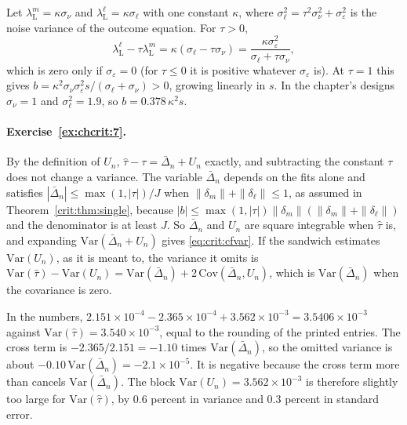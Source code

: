 Let $\lambda_{\mathrm L}^m = \kappa\sigma_\nu$ and $\lambda_{\mathrm L}^\ell = \kappa\sigma_\ell$ with one constant $\kappa$, where $\sigma_\ell^2 = \tau^2\sigma_\nu^2 + \sigma_\varepsilon^2$ is the noise variance of the outcome equation. For $\tau > 0$,
\[
\lambda_{\mathrm L}^\ell - \tau\lambda_{\mathrm L}^m = \kappa(\sigma_\ell - \tau\sigma_\nu) = \frac{\kappa\sigma_\varepsilon^2}{\sigma_\ell + \tau\sigma_\nu},
\]
which is zero only if $\sigma_\varepsilon = 0$ (for $\tau \le 0$ it is positive whatever $\sigma_\varepsilon$ is). At $\tau = 1$ this gives $b = \kappa^2\sigma_\nu\sigma_\varepsilon^2 s/(\sigma_\ell + \sigma_\nu) > 0$, growing linearly in $s$. In the chapter's designs $\sigma_\nu = 1$ and $\sigma_\ell^2 = 1.9$, so $b = 0.378\,\kappa^2 s$.

\paragraph{Exercise~\ref{ex:chcrit:7}.} By the definition of $U_n$, $\hat\tau - \tau = \bar\Delta_n + U_n$ exactly, and subtracting the constant $\tau$ does not change a variance. The variable $\bar\Delta_n$ depends on the fits alone and satisfies $|\bar\Delta_n| \le \max(1, |\tau|)/J$ when $\|\delta_m\| + \|\delta_\ell\| \le 1$, as assumed in Theorem~\ref{crit:thm:single}, because $|b| \le \max(1, |\tau|)\|\delta_m\|(\|\delta_m\| + \|\delta_\ell\|)$ and the denominator is at least $J$. So $\bar\Delta_n$ and $U_n$ are square integrable when $\hat\tau$ is, and expanding $\mathrm{Var}(\bar\Delta_n + U_n)$ gives \eqref{eq:crit:cfvar}. If the sandwich estimates $\mathrm{Var}(U_n)$, as it is meant to, the variance it omits is $\mathrm{Var}(\hat\tau) - \mathrm{Var}(U_n) = \mathrm{Var}(\bar\Delta_n) + 2\,\mathrm{Cov}(\bar\Delta_n, U_n)$, which is $\mathrm{Var}(\bar\Delta_n)$ when the covariance is zero.

In the numbers, $2.151\times 10^{-4} - 2.365\times 10^{-4} + 3.562\times 10^{-3} = 3.5406\times 10^{-3}$ against $\mathrm{Var}(\hat\tau) = 3.540\times 10^{-3}$, equal to the rounding of the printed entries. The cross term is $-2.365/2.151 = -1.10$ times $\mathrm{Var}(\bar\Delta_n)$, so the omitted variance is about $-0.10\,\mathrm{Var}(\bar\Delta_n) = -2.1\times 10^{-5}$. It is negative because the cross term more than cancels $\mathrm{Var}(\bar\Delta_n)$. The block $\mathrm{Var}(U_n) = 3.562\times 10^{-3}$ is therefore slightly too large for $\mathrm{Var}(\hat\tau)$, by 0.6 percent in variance and 0.3 percent in standard error.

